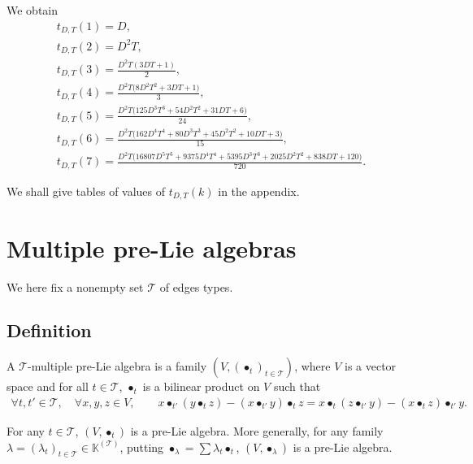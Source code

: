 \documentclass[pdftex]{sigma}
\numberwithin{equation}{section}
\newcommand{\K}{\mathbb{K}}
\newcommand{\T}{\mathcal{T}}
\begin{document}
\begin{Example}
We obtain
\begin{gather*}
t_{D,T}(1)=D,\\[.1ex]
t_{D,T}(2)=D^2T,\\[.1ex]
t_{D,T}(3)=\frac{D^2T(3DT+1)}{2},\\[.1ex]
t_{D,T}(4)=\frac{D^2T\big(8D^2T^2+3DT+1\big)}{3},\\[.1ex]
t_{D,T}(5)=\frac{D^2T\big(125D^3T^3+54D^2T^2+31DT+6\big)}{24},\\[.1ex]
t_{D,T}(6)=\frac{D^2T\big(162D^4T^4+80D^3T^3+45D^2T^2+10DT+3\big)}{15},\\[.1ex]
t_{D,T}(7)=\frac{D^2T\big(16807D^5T^5+9375D^4T^4+5395D^3T^3+2025D^2T^2+838DT+120\big)}{720}.
\end{gather*}
\end{Example}

We shall give tables of values of $t_{D,T}(k)$ in the appendix.

\section{Multiple pre-Lie algebras}

We here fix a nonempty set $\T$ of edges types.

\subsection{Definition}

\begin{Definition} \label{defi3}
A $\T$-multiple pre-Lie algebra is a family $(V,(\bullet_t)_{t\in \T})$,
where $V$ is a vector space and for all $t\in \T$,
$\bullet_t$ is a bilinear product on $V$ such that
\begin{gather*}
\forall t,t'\in \T,\quad\forall x,y,z\in V,\qquad
x\bullet_{t'}(y \bullet_t z)-(x\bullet_{t'} y)\bullet_t z=x\bullet_t(z \bullet_{t'} y)-(x\bullet_t z)\bullet_{t'} y.
\end{gather*}
\end{Definition}

\begin{Remark}
For any $t\in \T$, $(V,\bullet_t)$ is a pre-Lie algebra.
More generally, for any family $\lambda=(\lambda_t)_{t\in \T}\in \K^{(\T)}$,
putting $\bullet_\lambda=\sum \lambda_t \bullet_t$, $(V,\bullet_\lambda)$ is a pre-Lie algebra.
\end{Remark}
\end{document}
